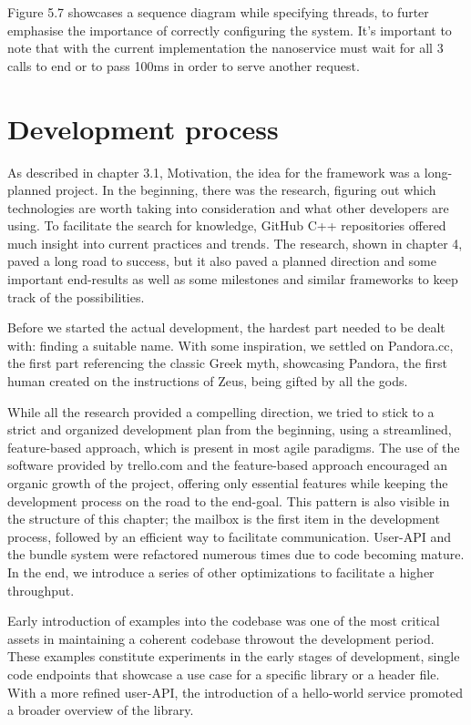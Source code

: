 Figure 5.7 showcases a sequence diagram while specifying threads, to furter emphasise the importance of correctly configuring the system. It's important to note that with the current implementation the  nanoservice must wait for all 3  calls to end or to pass 100ms in order to serve another request.


\section{Development process}
As described in chapter 3.1, Motivation, the idea for the framework was a long-planned project.
In the beginning, there was the research, figuring out which technologies are worth taking into consideration and what other developers are using. To facilitate the search for knowledge, GitHub C++ repositories offered much insight into current practices and trends.
The research, shown in chapter 4, paved a long road to success, but it also paved a planned direction and some important end-results as well as some milestones and similar frameworks to keep track of the possibilities. 

Before we started the actual development, the hardest part needed to be dealt with: finding a suitable name. With some inspiration, we settled on Pandora.cc, the first part referencing the classic Greek myth, showcasing Pandora, the first human created on the instructions of Zeus, being gifted by all the gods. 

While all the research provided a compelling direction, we tried to stick to a strict and organized development plan from the beginning, using a streamlined, feature-based approach, which is present in most agile paradigms. The use of the software provided by trello.com and the feature-based approach encouraged an organic growth of the project, offering only essential features while keeping the development process on the road to the end-goal. This pattern is also visible in the structure of this chapter; the mailbox is the first item in the development process, followed by an efficient way to facilitate communication. User-API and the bundle system were refactored numerous times due to code becoming mature. In the end, we introduce a series of other optimizations to facilitate a higher throughput.

Early introduction of examples into the codebase was one of the most critical assets in maintaining a coherent codebase throwout the development period. These examples constitute experiments in the early stages of development, single code endpoints that showcase a use case for a specific library or a header file. With a more refined user-API, the introduction of a hello-world service promoted a broader overview of the library.

